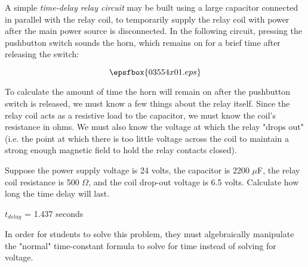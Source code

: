 

A simple {\it time-delay relay circuit} may be built using a large capacitor connected in parallel with the relay coil, to temporarily supply the relay coil with power after the main power source is disconnected.  In the following circuit, pressing the pushbutton switch sounds the horn, which remains on for a brief time after releasing the switch:

$$\epsfbox{03554x01.eps}$$

To calculate the amount of time the horn will remain on after the pushbutton switch is released, we must know a few things about the relay itself.  Since the relay coil acts as a resistive load to the capacitor, we must know the coil's resistance in ohms.  We must also know the voltage at which the relay "drops out" (i.e. the point at which there is too little voltage across the coil to maintain a strong enough magnetic field to hold the relay contacts closed).

Suppose the power supply voltage is 24 volts, the capacitor is 2200 $\mu$F, the relay coil resistance is 500 $\Omega$, and the coil drop-out voltage is 6.5 volts.  Calculate how long the time delay will last.







$t_{delay}$ = 1.437 seconds







In order for students to solve this problem, they must algebraically manipulate the "normal" time-constant formula to solve for time instead of solving for voltage.




